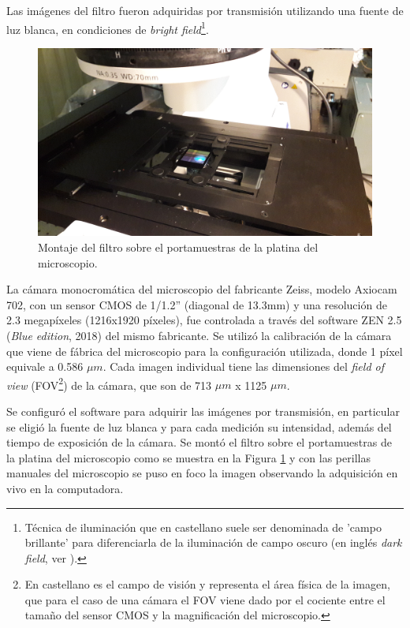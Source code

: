 Las imágenes del filtro fueron adquiridas por transmisión utilizando una fuente de luz blanca, en condiciones de \textit{bright field}\footnote{Técnica de iluminación que en castellano suele ser denominada de 'campo brillante' para diferenciarla de la iluminación de campo oscuro (en inglés \textit{dark field}, ver \href{https://es.wikipedia.org/wiki/Microscopio_de_campo_oscuro}{\faWikipediaW}).}.  
\begin{figure}[H]
	\centering
	\includegraphics[scale=0.1]{Figs/defectosZEISS/a.jpg}
	\caption{Montaje del filtro sobre el portamuestras de la platina del microscopio.}
	\label{fig:filtroenZEISS}
\end{figure}
La cámara monocromática del microscopio del fabricante Zeiss, modelo Axiocam 702, con un sensor CMOS de 1/1.2'' (diagonal de 13.3mm) y una resolución de 2.3 megapíxeles (1216x1920 píxeles), fue controlada a través del software ZEN 2.5 (\textit{Blue edition}, 2018) del mismo fabricante. Se utilizó la calibración de la cámara que viene de fábrica del microscopio para la configuración utilizada, donde 1 píxel equivale a 0.586 $\mu m$.  Cada imagen individual tiene las dimensiones del \textit{field of view} (FOV\footnote{En castellano es el campo de visión y representa el área física de la imagen, que para el caso de una cámara el FOV viene dado por el cociente entre el tamaño del sensor CMOS y la magnificación del microscopio.}) de la cámara, que son de 713 $\mu m$ x 1125 $\mu m$. 

Se configuró el software para adquirir las imágenes por transmisión, en particular se eligió la fuente de luz blanca y para cada medición su intensidad, además del tiempo de exposición de la cámara. Se montó el filtro sobre el portamuestras de la platina del microscopio como se muestra en la Figura \ref{fig:filtroenZEISS} y con las perillas manuales del microscopio se puso en foco la imagen observando la adquisición en vivo en la computadora. 

